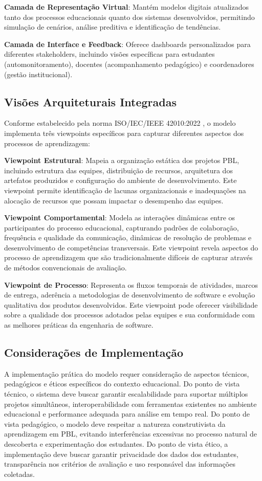 \documentclass[12pt, a4paper, oneside, brazilian]{abntex2}
\begin{document}
\textbf{Camada de Representação Virtual}: Mantém modelos digitais atualizados tanto dos processos educacionais quanto dos sistemas desenvolvidos, permitindo simulação de cenários, análise preditiva e identificação de tendências.

\textbf{Camada de Interface e Feedback}: Oferece dashboards personalizados para diferentes stakeholders, incluindo visões específicas para estudantes (automonitoramento), docentes (acompanhamento pedagógico) e coordenadores (gestão institucional).

\subsection{Visões Arquiteturais Integradas}

Conforme estabelecido pela norma ISO/IEC/IEEE 42010:2022 \cite{iso42010}, o modelo implementa três viewpoints específicos para capturar diferentes aspectos dos processos de aprendizagem:

\textbf{Viewpoint Estrutural}: Mapeia a organização estática dos projetos PBL, incluindo estrutura das equipes, distribuição de recursos, arquitetura dos artefatos produzidos e configuração do ambiente de desenvolvimento. Este viewpoint permite identificação de lacunas organizacionais e inadequações na alocação de recursos que possam impactar o desempenho das equipes.

\textbf{Viewpoint Comportamental}: Modela as interações dinâmicas entre os participantes do processo educacional, capturando padrões de colaboração, frequência e qualidade da comunicação, dinâmicas de resolução de problemas e desenvolvimento de competências transversais. Este viewpoint revela aspectos do processo de aprendizagem que são tradicionalmente difíceis de capturar através de métodos convencionais de avaliação.

\textbf{Viewpoint de Processo}: Representa os fluxos temporais de atividades, marcos de entrega, aderência a metodologias de desenvolvimento de software e evolução qualitativa dos produtos desenvolvidos. Este viewpoint pode oferecer visibilidade sobre a qualidade dos processos adotados pelas equipes e sua conformidade com as melhores práticas da engenharia de software.

\subsection{Considerações de Implementação}

A implementação prática do modelo requer consideração de aspectos técnicos, pedagógicos e éticos específicos do contexto educacional. Do ponto de vista técnico, o sistema deve buscar garantir escalabilidade para suportar múltiplos projetos simultâneos, interoperabilidade com ferramentas existentes no ambiente educacional e performance adequada para análise em tempo real. Do ponto de vista pedagógico, o modelo deve respeitar a natureza construtivista da aprendizagem em PBL, evitando interferências excessivas no processo natural de descoberta e experimentação dos estudantes. Do ponto de vista ético, a implementação deve buscar garantir privacidade dos dados dos estudantes, transparência nos critérios de avaliação e uso responsável das informações coletadas.
\end{document}

